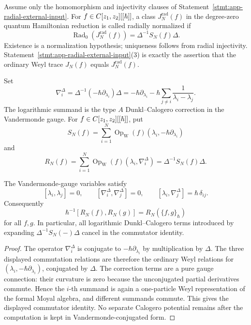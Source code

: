 \begin{defn}
Assume only the homomorphism and injectivity clauses of
Statement~\ref{stmt:app-radial-external-input}.  For
\(f\in C[z_1,z_2][[\hbar]]\), a class \(J_N^{\mathrm{rad}}(f)\) in the
degree-zero quantum Hamiltonian reduction is called radially normalized
if
\[
  \operatorname{Rad}_0(J_N^{\mathrm{rad}}(f))
  =\Delta^{-1}S_N(f)\Delta .
\]
Existence is a normalization hypothesis; uniqueness follows from radial
injectivity.  Statement~\ref{stmt:app-radial-external-input}(3) is
exactly the assertion that the ordinary Weyl trace \(J_N(f)\) equals
\(J_N^{\mathrm{rad}}(f)\).
\end{defn}

\begin{defn}
\label{def:app-radial-vandermonde-gauge-variables}
  Set
  \[
    \nabla_i^\Delta
      =
      \Delta^{-1}(-\hbar\partial_{\lambda_i})\Delta
      =
      -\hbar\partial_{\lambda_i}
      -\hbar\sum_{j\neq i}\frac{1}{\lambda_i-\lambda_j}.
  \]
  The logarithmic summand is the type \(A\) Dunkl--Calogero correction
  in the Vandermonde gauge.  For \(f\in C[z_1,z_2][[\hbar]]\), put
  \[
    S_N(f)=\sum_{i=1}^N
      \operatorname{Op}_{\mathrm W}
      (f)(\lambda_i,-\hbar\partial_{\lambda_i})
  \]
  and
  \[
    R_N(f)=
      \sum_{i=1}^N
      \operatorname{Op}_{\mathrm W}
      (f)(\lambda_i,\nabla_i^\Delta)
      =
      \Delta^{-1}S_N(f)\Delta .
  \]
\end{defn}

\begin{lem}
\label{lem:app-radial-dunkl-calogero-cancellation}
  The Vandermonde-gauge variables satisfy
  \[
    [\lambda_i,\lambda_j]=0,\qquad
    [\nabla_i^\Delta,\nabla_j^\Delta]=0,\qquad
    [\lambda_i,\nabla_j^\Delta]=\hbar\,\delta_{ij}.
  \]
  Consequently
  \[
    \hbar^{-1}[R_N(f),R_N(g)]=R_N(\{f,g\}_\hbar)
  \]
  for all \(f,g\).  In particular, all logarithmic
  Dunkl--Calogero terms introduced by expanding
  \(\Delta^{-1}S_N(-)\Delta\) cancel in the commutator identity.
\end{lem}

\begin{proof}
  The operator \(\nabla_i^\Delta\) is conjugate to
  \(-\hbar\partial_{\lambda_i}\) by multiplication by \(\Delta\).
  The three displayed commutation relations are therefore the ordinary
  Weyl relations for
  \((\lambda_i,-\hbar\partial_{\lambda_i})\), conjugated by
  \(\Delta\).  The correction terms are a pure gauge connection:
  their curvature is zero because the unconjugated partial derivatives
  commute.  Hence the \(i\)-th summand is again a one-particle Weyl
  representation of the formal Moyal algebra, and different summands
  commute.  This gives the displayed commutator identity.  No separate
  Calogero potential remains after the computation is kept in
  Vandermonde-conjugated form.
\end{proof}

